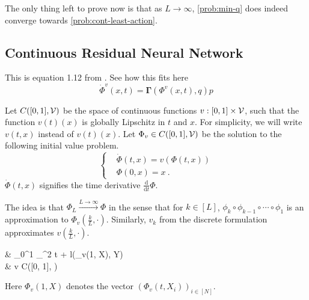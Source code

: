 
The only thing left to prove now is that as $L \rightarrow \infty$, \cref{prob:min-q} does indeed converge towards \cref{prob:cont-least-action}.



\subsection{Continuous Residual Neural Network} 
This is equation 1.12 from \cite{owhadi20}.
See how this fits here
\begin{equation}
	\label{eq:phi-v-differential-equation}
	\dot{\Phi}^v(x, t) = \mathbf{\Gamma}(\Phi^v(x, t), q) p
\end{equation}

Let $C([0, 1], \mathcal{V})$ be the space of continuous functions $v: [0, 1] \times \mathcal{V}$, such that the function $v(t)(x)$ is globally Lipschitz in $t$ and $x$.
For simplicity, we will write $v(t, x)$ instead of $v(t)(x)$.
Let $\Phi_v \in C([0, 1], \mathcal{V})$ be the solution to the following initial value problem.
\begin{equation}
	\begin{cases}
		&\dot{\Phi}(t, x) = v(\Phi(t, x))\\
		&\Phi(0, x) = x \ .
	\end{cases}
\end{equation}
$\dot{\Phi}(t, x)$ signifies the time derivative $\frac{\mathrm{d}}{\mathrm{d}t}\Phi$.

The idea is that $\Phi_L \stackrel{L \rightarrow \infty}{\longrightarrow} \Phi$ in the sense that for $k \in [L]$, $\phi_k \circ \phi_{k-1} \circ \cdots \circ \phi_1$ is an approximation to $\Phi_v(\frac{k}{L}, \cdot)$.
Similarly, $v_k$ from the discrete formulation approximates $v(\frac{k}{L}, \cdot)$.

\begin{problem}
	\label{prob:resnet-limit}
	\begin{cases}
		&  \int_{0}^{1} _\cV^2 t
		+ l(\Phi_v(1, X), Y)\\
		& v \in C([0, 1], \cV)\\
	\end{cases}
\end{problem}
Here $\Phi_v(1, X)$ denotes the vector $(\Phi_v(t, X_i))_{i \in [N]}$.

